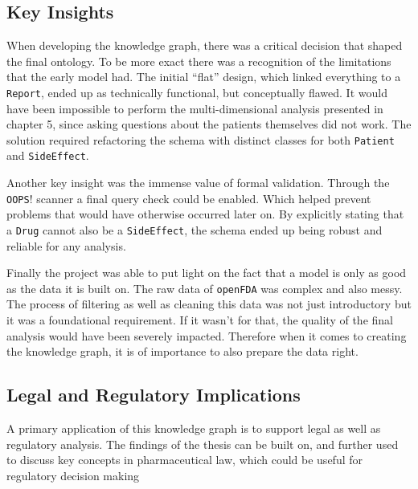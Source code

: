 \subsection{Key Insights}
When developing the knowledge graph, there was a critical decision that shaped the final ontology. To be more exact there was a recognition of the limitations that the early model had. The initial “flat” design, which linked everything to a \texttt{Report}, ended up as technically functional, but conceptually flawed. It would have been impossible to perform the multi-dimensional analysis presented in chapter 5, since asking questions about the patients themselves did not work. The solution required refactoring the schema with distinct classes for both \texttt{Patient} and \texttt{Side\-Effect}.

Another key insight was the immense value of formal validation. Through the \texttt{OOPS}! scanner a final query check could be enabled. Which helped prevent problems that would have otherwise occurred later on. By explicitly stating that a \texttt{Drug} cannot also be a \texttt{Side\-Effect}, the schema ended up being robust and reliable for any analysis.

Finally the project was able to put light on the fact that a model is only as good as the data it is built on. The raw data of \texttt{openFDA} was complex and also messy. The process of filtering as well as cleaning this data was not just introductory but it was a foundational requirement. If it wasn't for that, the quality of the final analysis would have been severely impacted. Therefore when it comes to creating the knowledge graph, it is of importance to also prepare the data right.

\subsection{Legal and Regulatory Implications}
A primary application of this knowledge graph is to support legal as well as regulatory analysis. The findings of the thesis can be built on, and further used to discuss key concepts in pharmaceutical law, which could be useful for regulatory decision making
